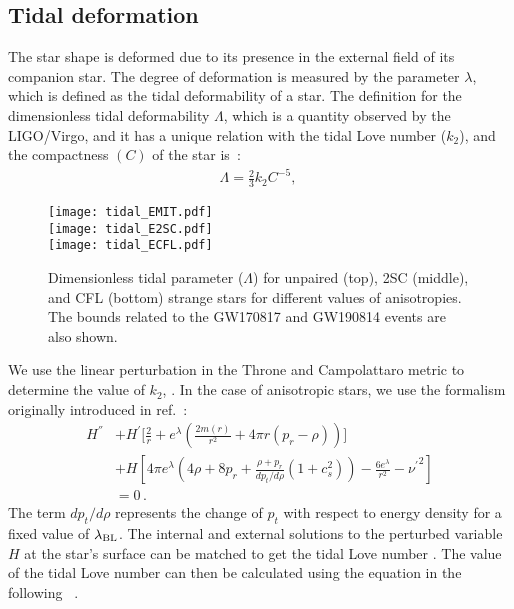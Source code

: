 \documentclass[%
reprint,
superscriptaddress,
nofootinbib,
amsmath,
amssymb,
aps,
floatfix,
showkeys,
]{revtex4-2}
\begin{document}
\subsection{Tidal deformation}
The star shape is deformed due to its presence in the external field of its companion star. The degree of deformation is measured by the parameter $\lambda$, which is defined as the tidal deformability of a star. The definition for the dimensionless tidal deformability $\Lambda$, which is a quantity observed by the LIGO/Virgo, and it has a unique relation with the tidal Love number ($k_2$), and the compactness $(C)$ of the star is~\cite{Hinderer_2008, Hinderer_2009}: 
\begin{eqnarray}
 \Lambda = \frac{2}{3} k_2 C^{-5}, ~\label{tidaleq}
\end{eqnarray}
\begin{figure}
    \centering
    \texttt{[image: tidal\_EMIT.pdf]} \\
     \texttt{[image: tidal\_E2SC.pdf]} \\
       \texttt{[image: tidal\_ECFL.pdf]}
\caption{Dimensionless tidal parameter ($\Lambda$) for unpaired (top), 2SC (middle), and  CFL (bottom) strange stars for different values of anisotropies. The bounds related to the GW170817 and GW190814 events are also shown.}
\label{tidal}
\end{figure}
We use the linear perturbation in the Throne and Campolattaro metric to determine the value of $k_2$, \cite{Throne_1967}. In the case of anisotropic stars, we use the formalism originally introduced in ref.~\cite{Biswas_2019}:
\begin{align}
H^{''} &+ H^{'} \bigg[\frac{2}{r} + e^{\lambda} \left(\frac{2m(r)}{r^2} + 4 \pi r (p_r - {\rho})\right)\bigg] 
\nonumber \\
&
+ H \left[4\pi e^{\lambda} \left(4\rho + 8p_r + \frac{\rho + p_r}{dp_t/d\rho}(1+c_s^2)\right) -\frac{6 e^{\lambda}}{r^2} - {\nu^\prime}^2\right] 
\nonumber \\
&
= 0\,.
\end{align}
The term $dp_t/d\rho$ represents the change of $p_t$ with respect to energy density for a fixed value of $\lambda_{\rm BL}$. The internal and external solutions to the perturbed variable $H$ at the star's surface can be matched to get the tidal Love number \cite{Damour_2009, Hinderer_2008}. The value of the tidal Love number can then be calculated using the equation in the following ~\cite{Hinderer_2008, Hinderer_2009, Flores_2020, DasBig_2021}.  
\end{document}
